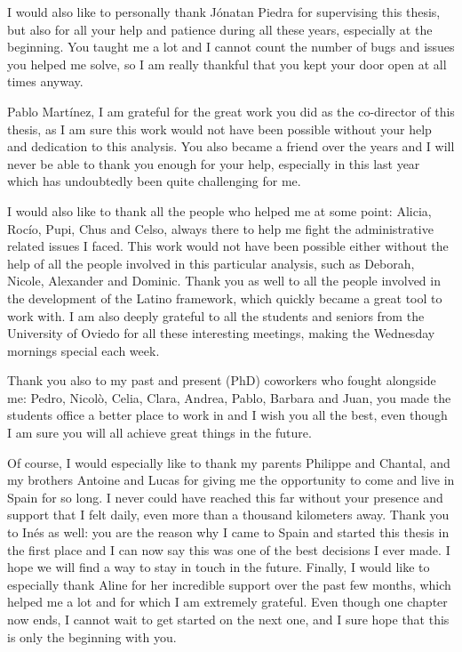 \documentclass[a4paper, 10pt, openright]{report}
\begin{document}
I would also like to personally thank J\'{o}natan Piedra for supervising this thesis, but also for all your help and patience during all these years, especially at the beginning. You taught me a lot and I cannot count the number of bugs and issues you helped me solve, so I am really thankful that you kept your door open at all times anyway.

Pablo Mart\'{i}nez, I am grateful for the great work you did as the co-director of this thesis, as I am sure this work would not have been possible without your help and dedication to this analysis. You also became a friend over the years and I will never be able to thank you enough for your help, especially in this last year which has undoubtedly been quite challenging for me. 

I would also like to thank all the people who helped me at some point: Alicia, Roc\'{i}o, Pupi, Chus and Celso, always there to help me fight the administrative related issues I faced. This work would not have been possible either without the help of all the people involved in this particular analysis, such as Deborah, Nicole, Alexander and Dominic. Thank you as well to all the people involved in the development of the Latino framework, which quickly became a great tool to work with. I am also deeply grateful to all the students and seniors from the University of Oviedo for all these interesting meetings, making the Wednesday mornings special each week. 

Thank you also to my past and present (PhD) coworkers who fought alongside me: Pedro, Nicol\`{o}, Celia, Clara, Andrea, Pablo, Barbara and Juan, you made the students office a better place to work in and I wish you all the best, even though I am sure you will all achieve great things in the future.

Of course, I would especially like to thank my parents Philippe and Chantal, and my brothers Antoine and Lucas for giving me the opportunity to come and live in Spain for so long. I never could have reached this far without your presence and support that I felt daily, even more than a thousand kilometers away. Thank you to In\'{e}s as well: you are the reason why I came to Spain and started this thesis in the first place and I can now say this was one of the best decisions I ever made. I hope we will find a way to stay in touch in the future. Finally, I would like to especially thank Aline for her incredible support over the past few months, which helped me a lot and for which I am extremely grateful. Even though one chapter now ends, I cannot wait to get started on the next one, and I sure hope that this is only the beginning with you.
\end{document}

